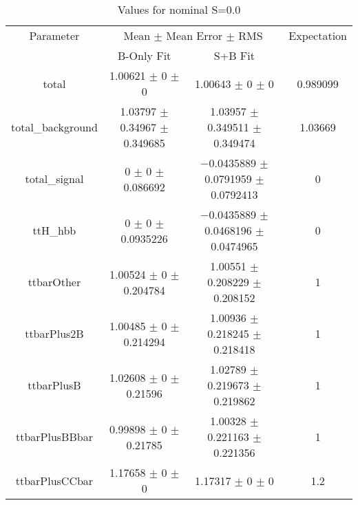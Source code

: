 \begin{table}
\centering
\caption{Values for nominal S=0.0}
\begin{tabular}{cccc}
\toprule
Parameter & \multicolumn{2}{c}{Mean $\pm$ Mean Error $\pm$ RMS} & Expectation\\
 & B-Only Fit & S+B Fit & \\
\midrule
total & \num{1.00621} $\pm$ \num{0} $\pm$ \num{0} & \num{1.00643} $\pm$ \num{0} $\pm$ \num{0} & \num{0.989099}\\
total\_background & \num{1.03797} $\pm$ \num{0.34967} $\pm$ \num{0.349685} & \num{1.03957} $\pm$ \num{0.349511} $\pm$ \num{0.349474} & \num{1.03669}\\
total\_signal & \num{0} $\pm$ \num{0} $\pm$ \num{0.086692} & \num{-0.0435889} $\pm$ \num{0.0791959} $\pm$ \num{0.0792413} & \num{0}\\
ttH\_hbb & \num{0} $\pm$ \num{0} $\pm$ \num{0.0935226} & \num{-0.0435889} $\pm$ \num{0.0468196} $\pm$ \num{0.0474965} & \num{0}\\
ttbarOther & \num{1.00524} $\pm$ \num{0} $\pm$ \num{0.204784} & \num{1.00551} $\pm$ \num{0.208229} $\pm$ \num{0.208152} & \num{1}\\
ttbarPlus2B & \num{1.00485} $\pm$ \num{0} $\pm$ \num{0.214294} & \num{1.00936} $\pm$ \num{0.218245} $\pm$ \num{0.218418} & \num{1}\\
ttbarPlusB & \num{1.02608} $\pm$ \num{0} $\pm$ \num{0.21596} & \num{1.02789} $\pm$ \num{0.219673} $\pm$ \num{0.219862} & \num{1}\\
ttbarPlusBBbar & \num{0.99898} $\pm$ \num{0} $\pm$ \num{0.21785} & \num{1.00328} $\pm$ \num{0.221163} $\pm$ \num{0.221356} & \num{1}\\
ttbarPlusCCbar & \num{1.17658} $\pm$ \num{0} $\pm$ \num{0} & \num{1.17317} $\pm$ \num{0} $\pm$ \num{0} & \num{1.2}\\
\bottomrule
\end{tabular}
\end{table}
